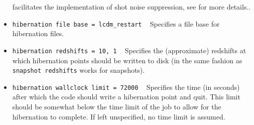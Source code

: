 \documentclass[a4paper,10pt]{article}
\begin{document}
\begin{itemize}
{facilitates the implementation of shot noise suppression, see \cite{Adamek:2016zes} for more details.}.
 \item[] \hspace{-25pt}\texttt{hibernation file base = lcdm\_restart} ~ Specifies a file base for hibernation files.
 \item[] \hspace{-25pt}\texttt{hibernation redshifts = 10, 1} ~ Specifies the (approximate) redshifts at which hibernation points should be
 written to disk (in the same fashion as \texttt{snapshot redshifts} works for snapshots).
 \item[] \hspace{-25pt}\texttt{hibernation wallclock limit = 72000} ~ Specifies the time (in seconds) after which the code should write
 a hibernation point and quit. This limit should be somewhat below the time limit of the job to allow for the hibernation to complete.
 If left unspecified, no time limit is assumed.
\end{itemize}
\end{document}
